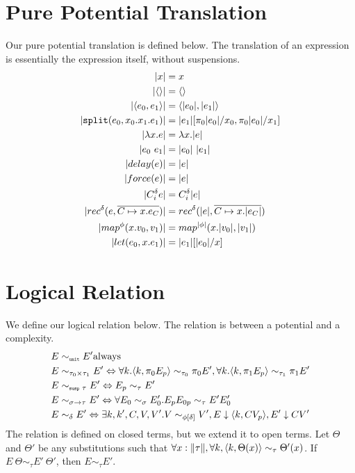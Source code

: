 \section{Pure Potential Translation}
Our pure potential translation is defined below. The translation of an
expression is essentially the expression itself, without suspensions.
%
\begin{align*}
  |x| &= x                                                                                     \\
  |\LP\RP| &= \LP\RP                                                           \\
  |\LP e_0, e_1 \RP | &= \LP |e_0|, |e_1| \RP                                  \\
  |\texttt{split}(e_0, x_0. x_1. e_1)| &= |e_1|[\pi_0|e_0|/x_0, \pi_0|e_0|/x_1]                \\
  |\lambda x.e | &= \lambda x.|e|                                                              \\
  |e_0\ e_1| &= |e_0|\ |e_1|                                                                   \\
  |delay(e)| &= |e|                                                                            \\
  |force(e)| &= |e|                                                                            \\
  |C_i^\delta e| &= C_i^\delta |e|                                                             \\
  |rec^\delta(e, \overline{C \mapsto x.e_C})| &= rec^\delta(|e|, \overline{C \mapsto x.|e_C|}) \\
  |map^\phi(x.v_0, v_1)| &= map^{|\phi|}(x.|v_0|, |v_1|)                                       \\
  |let(e_0, x.e_1)| &= |e_1|[|e_0|/x]
\end{align*}
%
\section{Logical Relation}
We define our logical relation below. The relation is between a potential and a
complexity.
%
\begin{align*}
  E &\sim_{\texttt{\tiny{unit}}} E' \text{always}  \\
  E &\sim_{\tau_0 \times \tau_1} E' \Leftrightarrow \forall k. \langle k, \pi_0 E_p\rangle \sim_{\tau_0} \pi_0 E', \forall k. \langle k, \pi_1 E_p\rangle \sim_{\tau_1} \pi_1 E' \\
  E &\sim_{\texttt{\tiny{susp }} \tau} E' \Leftrightarrow E_p \sim_\tau E' \\
  E &\sim_{\sigma \to \tau} E' \Leftrightarrow \forall E_0 \sim_\sigma E'_0. E_p E_{0p} \sim_\tau E' E'_0 \\
  E &\sim_\delta E' \Leftrightarrow \exists k, k', C, V, V'. V \sim_{\phi[\delta]} V', E \downarrow \langle k, C V_p \rangle, E' \downarrow C V'
\end{align*}
%
The relation is defined on closed terms, but we extend it to open terms.  Let
$\Theta$ and $\Theta'$ be any substitutions such that $\forall x : \|\tau\|,
\forall k, \langle k, \Theta(x) \rangle \sim_\tau \Theta'(x)$.  If $E\ \Theta \sim_\tau
E'\ \Theta'$, then $E \sim_\tau E'$.



